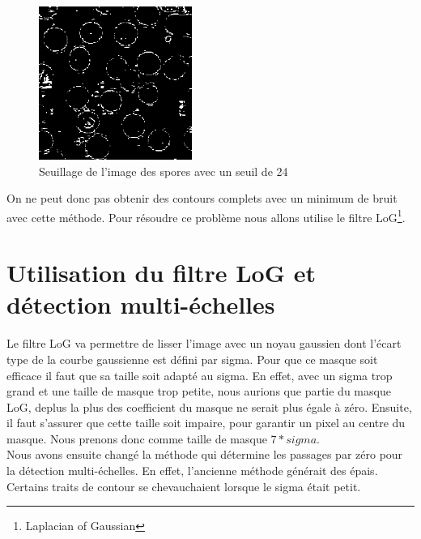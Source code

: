 \documentclass[a4paper,11pt]{article}
\begin{document}
  \begin{figure}[H]
   \center
   \includegraphics[width=5cm]{../seuillage24.png}
   \caption{Seuillage de l'image des spores avec un seuil de 24}
  \end{figure}
  
  On ne peut donc pas obtenir des contours complets avec un minimum de bruit avec cette méthode. Pour résoudre ce problème
  nous allons utilise le filtre LoG\footnote{Laplacian of Gaussian}.
  
  \section{Utilisation du filtre LoG et détection multi-échelles}
  Le filtre LoG va permettre de lisser l'image avec un noyau gaussien dont l'écart type de la courbe gaussienne est défini par
  sigma. Pour que ce masque soit efficace il faut que sa taille soit adapté au sigma. En effet, avec un sigma trop grand et 
  une taille de masque trop petite, nous aurions que partie du masque LoG, deplus la plus des coefficient du masque ne serait 
  plus égale à zéro. Ensuite, il faut s'assurer que cette taille soit impaire, pour garantir un pixel au centre du masque.
  Nous prenons donc comme taille de masque $7*sigma$.\\

  Nous avons ensuite changé la méthode qui détermine les passages par zéro pour la détection multi-échelles. En effet, 
  l'ancienne méthode générait des épais. Certains traits de contour se chevauchaient lorsque le sigma était petit. 
  
\end{document}
